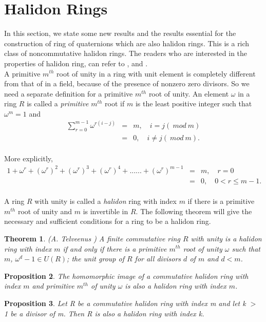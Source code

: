 \documentclass[sn-mathphys,Numbered]{sn-jnl}%
\theoremstyle{thmstyleone}
\newtheorem{theorem}{Theorem}
\newtheorem{proposition}[theorem]{Proposition}
\theoremstyle{thmstyletwo}
\theoremstyle{thmstylethree}
\begin{document}
\section{Halidon Rings}
In this section, we state some new results and the results essential for the construction of ring of quaternions which are also halidon rings. This is a rich class of noncommutative halidon rings. 
 The readers who are interested in the properties of halidon ring, can refer to \cite{at}, \cite{ath} and \cite{ath1}. \\
A primitive $m^{th}$ root of unity in a ring with unit element is completely different from that of in a field, because of the presence of nonzero zero divisors.  So we need a separate definition for a primitive $m^{th}$ root of unity. An element $\omega $ in a ring $R$ is called a  \textit{primitive} $m^{th}$ root if $m$ is the least positive integer such that  $\omega^{m}=1$ and
\begin{eqnarray*}
\sum_{r=0}^{m-1} \omega^{r(i-j)}&=& m, \quad  i= j (\ mod \ m )\\ &=& 0, \quad  i\neq j (\ mod \ m ). \end{eqnarray*} \\
More explicitly,
\begin{eqnarray*}
1+ \omega^{r}+(\omega^{r})^{2}+(\omega^{r})^{3}+(\omega^{r})^{4}+......+(\omega^{r})^{m-1}&=& m, \quad  r=0 \\ &=& 0, \quad 0<r\leq m-1. \end{eqnarray*} \\
A ring $R$ with unity is called a \textit{halidon} ring with index $m$ if there is a  primitive $m^{th}$ root of unity and $m$ is invertible in $R$. 
The following theorem will give the necessary and sufficient conditions for a ring to be a halidon ring. 
\begin{theorem} \label{rd2} (A. Telveenus \cite{ath})
A finite commutative ring $R$ with unity is a halidon ring with index $m$ if and only if there is a primitive $m^{th}$ root of unity  $\omega$ such that $m$, $\omega^{d}-1 \in U(R)$; the unit group of $R$ for all divisors $d$ of $m$ and $d<m$.
\end{theorem}
\begin{proposition} \label{rd16}
The homomorphic image of a commutative halidon ring with index $m$ and primitive $m^{th}$ of unity $\omega$ is also a halidon ring with index $m$.
\end{proposition}
\begin{proposition}\label{rd20}
Let R be a commutative halidon ring with index m and let k $>$ 1 be a divisor of m. Then R is also a halidon ring with index k.
\end{proposition}
\end{document}
